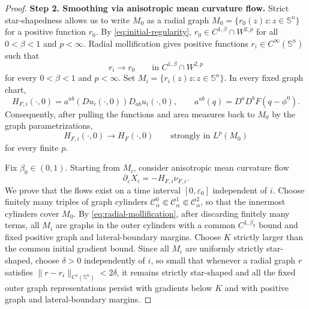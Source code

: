 \documentclass[10pt,a4paper]{amsart}
\numberwithin{equation}{section}
\begin{document}
\begin{proof}
\medskip
\noindent
\textbf{Step 2. Smoothing via anisotropic mean curvature flow.}
Strict star-shapedness allows us to write $M_0$ as a radial graph $M_0=\{r_0(z)z:z\in\mathbb S^n\}$  for a positive function $r_0$. By \eqref{eq:initial-regularity}, $r_0\in C^{1,\beta}\cap W^{2,p}$ for all $0<\beta<1$ and $p<\infty$. Radial mollification gives positive functions $r_i\in C^\infty(\mathbb S^n)$ such that
\begin{equation}
\label{eq:radial-mollification}
 r_i\longrightarrow r_0
 \qquad\text{in }C^{1,\beta}\cap W^{2,p}
\end{equation}
for every $0<\beta<1$ and $p<\infty$. Set $M_i=\{r_i(z)z:z\in\mathbb S^n\}$. In every fixed graph chart,
\begin{equation*}
 H_{F,i}(\cdot,0)=a^{ab}(Du_i(\cdot,0))D_{ab}u_i(\cdot,0),
 \qquad
 a^{ab}(q)=D^aD^bF(q-\phi^0).
\end{equation*}
Consequently, after pulling the functions and area measures back to $M_0$ by the graph parametrizations,
\begin{equation}
\label{eq:initial-H-strong}
 H_{F,i}(\cdot,0)\longrightarrow H_F(\cdot,0)
 \qquad\text{strongly in }L^p(M_0)
\end{equation}
for every finite $p$.

Fix $\beta_0\in(0,1)$. Starting from $M_i$, consider anisotropic mean curvature flow
\begin{equation*}
 \partial_\varepsilon X_i=-H_{F,i}\nu_{F,i}.
\end{equation*}
We prove that the flows exist on a time interval $[0,\varepsilon_0]$ independent of $i$. Choose finitely many triples of graph cylinders $\mathcal C^0_\alpha\Subset\mathcal C^1_\alpha\Subset\mathcal C^2_\alpha$, so that the innermost cylinders cover $M_0$. By \eqref{eq:radial-mollification}, after discarding finitely many terms, all $M_i$ are graphs in the outer cylinders with a common $C^{1,\beta_0}$ bound and fixed positive graph and lateral-boundary margins. Choose $K$ strictly larger than the common initial gradient bound. Since all $M_i$ are uniformly strictly star-shaped, choose $\delta>0$ independently of $i$, so small that whenever a radial graph $r$ satisfies $\|r-r_i\|_{C^1(\mathbb S^n)}<2\delta$,  it remains strictly star-shaped and all the fixed outer graph representations persist with gradients below $K$ and with positive graph and lateral-boundary margins.


\end{proof}
\end{document}
